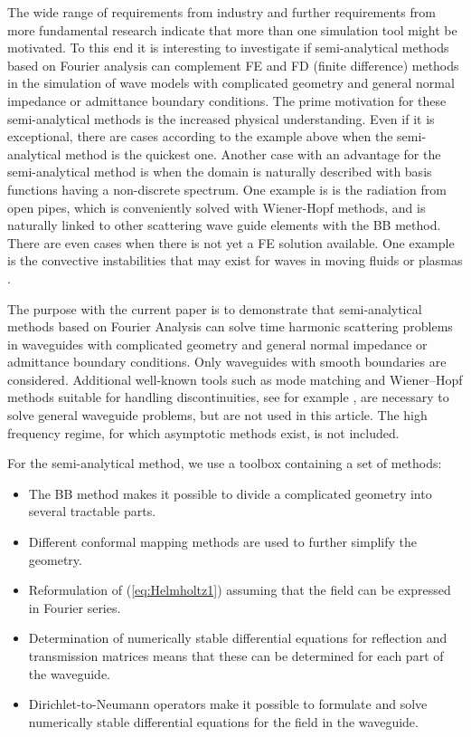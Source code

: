 \documentclass[numreferences]{kluwer}
\begin{document}
The wide range of requirements from industry and further requirements
from more fundamental research indicate that more than one simulation
tool might be motivated. To this end it is interesting to investigate
if semi-analytical methods based on Fourier analysis can complement FE
and FD (finite difference) methods in the simulation of wave models
with complicated geometry and general normal impedance or admittance
boundary conditions. The prime motivation for these semi-analytical
methods is the increased physical understanding. Even if it is
exceptional, there are cases according to the example above when the
semi-analytical method is the quickest one. Another case with an
advantage for the semi-analytical method is when the domain is
naturally described with basis functions having a non-discrete
spectrum. One example is is the radiation from open pipes, which is
conveniently solved with Wiener-Hopf methods, and is naturally linked
to other scattering wave guide elements with the BB method. There are
even cases when there is not yet a FE solution available. One example
is the convective instabilities that may exist for waves in moving
fluids \cite{nilssonbrander1980a} or plasmas \cite{briggs1964}.

The purpose with the current paper is to demonstrate that
semi-analytical methods based on Fourier Analysis can solve time
harmonic scattering problems in waveguides with complicated geometry
and general normal impedance or admittance boundary conditions. Only
waveguides with smooth boundaries are considered. Additional
well-known tools such as mode matching and Wiener--Hopf methods
suitable for handling discontinuities, see for example
\cite{jones1986}, are necessary to solve general waveguide problems,
but are not used in this article. The high frequency regime, for which
asymptotic methods exist, is not included.

For the semi-analytical method, we use a toolbox containing a set of
methods:
\begin{itemize}
\item The BB method makes it possible to divide a complicated geometry
  into several tractable parts.
\item Different conformal mapping methods are used to further simplify
  the geometry.
\item Reformulation of (\ref{eq:Helmholtz1}) assuming that the field
  can be expressed in Fourier series.
\item Determination of numerically stable differential equations for
  reflection and transmission matrices means that these can be
  determined for each part of the waveguide.
\item Dirichlet-to-Neumann operators make it possible to formulate and
  solve numerically stable differential equations for the field in the
  waveguide.
\end{itemize}
\end{document}
